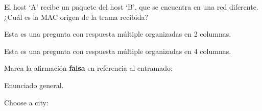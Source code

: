 \documentclass[english]{arco-exam}
\begin{document}
\begin{questions}
\begin{simpleQuestion}
  El host `A' recibe un paquete del host `B', que se encuentra en una red
    diferente. ¿Cuál es la MAC origen de la trama recibida?

\end{simpleQuestion}


\begin{simpleQuestion}
  Esta es una pregunta con respuesta múltiple organizadas en 2 columnas.

  \begin{multicols}{2}
  \end{multicols}
\end{simpleQuestion}



\begin{simpleQuestion}
  Esta es una pregunta con respuesta múltiple organizadas en 4 columnas.

  \begin{multicols}{4}
    \mbox{}
    \mbox{}
    \mbox{}
    \mbox{}
  \end{multicols}

\end{simpleQuestion}


\begin{simpleQuestion}[1]
  Marca la afirmación \textbf{falsa} en referencia al entramado:

\end{simpleQuestion}


  \begin{multiQuestion}[12]
    Enunciado general.

    \begin{parts}
    \subQuestion[]
      Choose a city:



\end{parts}
\end{multiQuestion}
\end{questions}
\end{document}
